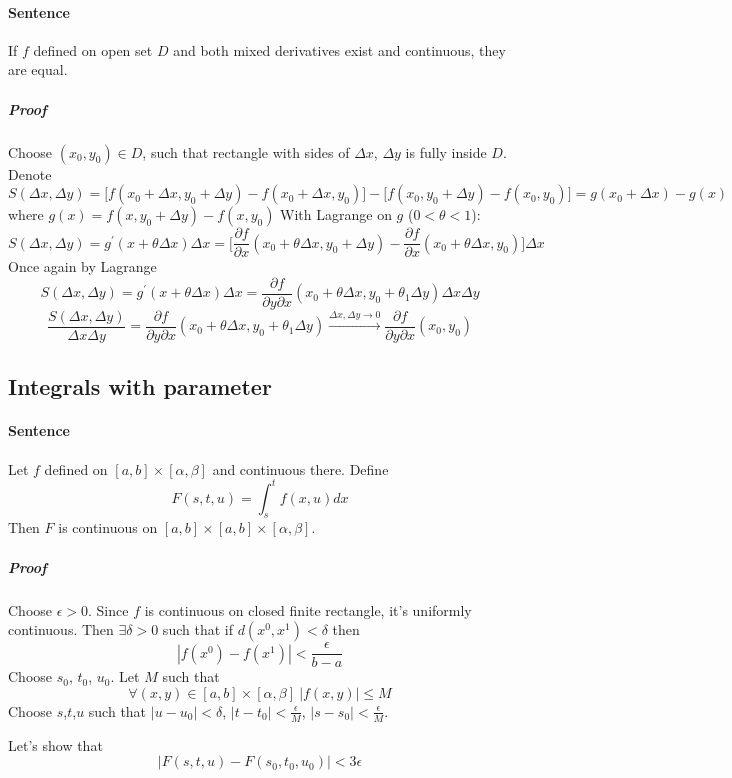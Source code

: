 \paragraph{Sentence}
If $f$ defined on open set $D$ and both mixed derivatives exist and continuous, they are equal.
\subparagraph{Proof}
Choose $(x_0, y_0) \in D$, such that rectangle with sides of $\Delta x$, $\Delta y$ is fully inside $D$.
Denote
$$S(\Delta x, \Delta y) = \big[ f(x_0+\Delta x, y_0 + \Delta y) - f(x_0+\Delta x, y_0) \big] - \big[ f(x_0, y_0 + \Delta y) - f(x_0, y_0) \big] = g(x_0+\Delta x) - g(x)$$
where $g(x) = f(x, y_0 + \Delta y) - f(x, y_0)$
With Lagrange on $g$ ($0 <\theta < 1$):
$$S(\Delta x, \Delta y) = g^\prime (x+\theta \Delta x) \Delta x = \big[\frac{\partial f}{\partial x}(x_0+\theta \Delta x, y_0+\Delta y) - \frac{\partial f}{\partial x}(x_0+\theta \Delta x, y_0)\big]\Delta x$$
Once again by Lagrange
$$S(\Delta x, \Delta y) = g^\prime (x+\theta \Delta x) \Delta x = \frac{\partial f}{\partial y \partial x}(x_0+\theta \Delta x, y_0+\theta_1\Delta y)\Delta x\Delta y$$
$$\frac{S(\Delta x, \Delta y)}{\Delta x \Delta y} = \frac{\partial f}{\partial y \partial x}(x_0+\theta \Delta x, y_0+\theta_1\Delta y) \stackrel{\Delta x, \Delta y \to 0}{\to} \frac{\partial f}{\partial y \partial x}(x_0, y_0)$$
\subsection{Integrals with parameter}
\paragraph{Sentence} Let $f$ defined on $[a,b] \times [\alpha, \beta]$ and continuous there. Define
$$F(s,t,u) = \int_s^t f(x,u) dx$$
Then $F$ is continuous on $[a,b] \times [a,b] \times [\alpha, \beta]$.
\subparagraph{Proof}
Choose $\epsilon > 0 $. Since $f$ is continuous on closed finite rectangle, it's uniformly continuous. Then $\exists \delta >0 $ such that if $d(x^0,x^1) < \delta$ then
$$\left|  f(x^0)-f(x^1)\right| < \frac{\epsilon}{b-a}$$
Choose $s_0$, $t_0$, $u_0$.
Let $M$ such that $$\forall (x,y) \in [a,b] \times [\alpha, \beta] \: |f(x,y)| \leq M$$
Choose $s$,$t$,$u$ such that
$|u-u_0| < \delta$, 
$|t-t_0| < \frac{\epsilon}{M}$, 
$|s-s_0| < \frac{\epsilon}{M}$. 

Let's show that 
$$\left|F(s,t,u)-F(s_0,t_0,u_0)\right| < 3\epsilon$$

